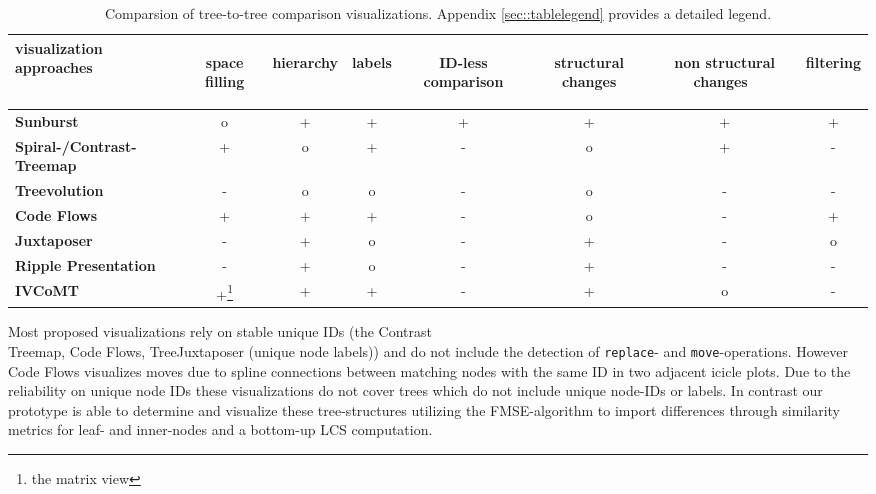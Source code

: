 \begin{table}[tb]
\centering 
\begin{tabular}[r]{|l|c|c|c|c|c|c|c|} 
\hline
\centering\textbf{visualization approaches} & \begin{sideways}\textbf{space filling}\end{sideways} & \begin{sideways}\textbf{hierarchy}\end{sideways} & \begin{sideways}\textbf{labels}\end{sideways} & \begin{sideways}\textbf{ID-less comparison}\end{sideways} & \begin{sideways}\textbf{structural changes}\end{sideways} & \begin{sideways}\textbf{non structural changes\ }\end{sideways} & \begin{sideways}\textbf{filtering}\end{sideways}\\
\hline
\hline
\textbf{Sunburst} & o & + & +\footnotemark & + & + & + & +\\
\hline
\textbf{Spiral-/Contrast-Treemap} & + & o & + & - & o & + & -\\
\hline
\textbf{Treevolution} & - & o & o\footnotemark & - & o & - & -\\
\hline
\textbf{Code Flows} & + & + & + & - & o & - & +\\
\hline
\textbf{Juxtaposer} & - & + & o & - & + & - & o \\
\hline
\textbf{Ripple Presentation} & - & + & o & - & + & - & -\\
\hline
\textbf{IVCoMT} & +\footnote{the matrix view} & + & + & - & + & o & -\\
\hline
\end{tabular}
\label{chap5:comparsion}
\vspace{0.5em} 
\caption{Comparsion of tree-to-tree comparison visualizations. Appendix \ref{sec::tablelegend} provides a detailed legend.}
\end{table}

Most proposed visualizations rely on stable unique IDs (the Contrast\\Treemap\cite{tu2007visualizing}, Code Flows\cite{telea2008code}, TreeJuxtaposer\cite{munzner2003treejuxtaposer} (unique node labels)) and do not include the detection of \texttt{replace}- and \texttt{move}-operations. However Code Flows visualizes moves due to spline connections between matching nodes with the same ID in two adjacent icicle plots. Due to the reliability on unique node IDs these visualizations do not cover trees which do not include unique node-IDs or labels. In contrast our prototype is able to determine and visualize these tree-structures utilizing the FMSE-algorithm to import differences through similarity metrics for leaf- and inner-nodes and a bottom-up LCS computation.

